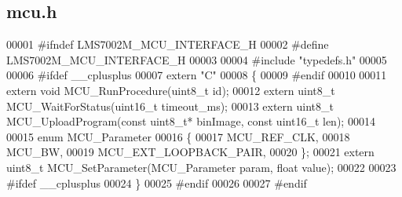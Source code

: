 \subsection{mcu.\+h}
\label{mcu_8h_source}

\begin{DoxyCode}
00001 \textcolor{preprocessor}{#ifndef LMS7002M\_MCU\_INTERFACE\_H}
00002 \textcolor{preprocessor}{#define LMS7002M\_MCU\_INTERFACE\_H}
00003 
00004 \textcolor{preprocessor}{#include "typedefs.h"}
00005 
00006 \textcolor{preprocessor}{#ifdef \_\_cplusplus}
00007 \textcolor{keyword}{extern} \textcolor{stringliteral}{"C"}
00008 \{
00009 \textcolor{preprocessor}{#endif}
00010 
00011 \textcolor{keyword}{extern} \textcolor{keywordtype}{void} MCU_RunProcedure(uint8\_t \textcolor{keywordtype}{id});
00012 \textcolor{keyword}{extern} uint8\_t MCU_WaitForStatus(uint16\_t timeout_ms);
00013 \textcolor{keyword}{extern} uint8\_t MCU_UploadProgram(\textcolor{keyword}{const} uint8\_t* binImage, \textcolor{keyword}{const} uint16\_t len);
00014 
00015 \textcolor{keyword}{enum} MCU_Parameter
00016 \{
00017     MCU_REF_CLK,
00018     MCU_BW,
00019     MCU_EXT_LOOPBACK_PAIR,
00020 \};
00021 \textcolor{keyword}{extern} uint8\_t MCU_SetParameter(MCU_Parameter param, \textcolor{keywordtype}{float} value);
00022 
00023 \textcolor{preprocessor}{#ifdef \_\_cplusplus}
00024 \}
00025 \textcolor{preprocessor}{#endif}
00026 
00027 \textcolor{preprocessor}{#endif}
\end{DoxyCode}
